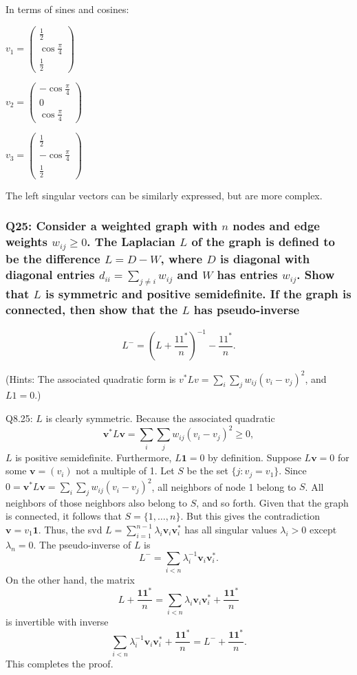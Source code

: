 \documentclass[8pt]{article}
\begin{document}
{In terms of sines and cosines:

$v_1 = \begin{pmatrix} \frac{1}{2} \\ \cos{\frac{\pi}{4}} \\ \frac{1}{2} \end{pmatrix}$

$v_2 = \begin{pmatrix} -\cos{\frac{\pi}{4}} \\ 0 \\ \cos{\frac{\pi}{4}} \end{pmatrix}$

$v_3 = \begin{pmatrix} \frac{1}{2} \\ -\cos{\frac{\pi}{4}} \\ \frac{1}{2} \end{pmatrix}$

The left singular vectors can be similarly expressed, but are more complex.

\subsubsection*{Q25: Consider a weighted graph with \( n \) nodes and edge weights \( w_{ij} \geq 0 \). The Laplacian \( L \) of the graph is defined to be the difference \( L = D - W \), where \( D \) is diagonal with diagonal entries \( d_{ii} = \sum_{j \neq i} w_{ij} \) and \( W \) has entries \( w_{ij} \). Show that \( L \) is symmetric and positive semidefinite. If the graph is connected, then show that the \( L \) has pseudo-inverse}
\[
L^- = \left( L + \frac{11^*}{n} \right)^{-1} - \frac{11^*}{n}.
\]

(Hints: The associated quadratic form is \( v^*Lv = \sum_i \sum_j w_{ij} (v_i - v_j)^2 \), and \( L1 = 0 \).)

Q8.25: \( L \) is clearly symmetric. Because the associated quadratic
\[
\mathbf{v}^* L \mathbf{v} = \sum_i \sum_j w_{ij} (v_i - v_j)^2 \geq 0,
\]
\noindent \( L \) is positive semidefinite. Furthermore, \( L \mathbf{1} = 0 \) by definition. Suppose \( L \mathbf{v} = 0 \) for some \( \mathbf{v} = (v_i) \) not a multiple of 1. Let \( S \) be the set \( \{ j : v_j = v_1 \} \). Since \( 0 = \mathbf{v}^* L \mathbf{v} = \sum_i \sum_j w_{ij} (v_i - v_j)^2 \), all neighbors of node 1 belong to \( S \). All neighbors of those neighbors also belong to \( S \), and so forth. Given that the graph is connected, it follows that \( S = \{ 1, \ldots, n \} \). But this gives the contradiction \( \mathbf{v} = v_1 \mathbf{1} \). Thus, the svd \( L = \sum_{i=1}^{n-1} \lambda_i \mathbf{v}_i \mathbf{v}_i^* \) has all singular values \( \lambda_i > 0 \) except \( \lambda_n = 0 \). The pseudo-inverse of \( L \) is
\[
L^- = \sum_{i < n} \lambda_i^{-1} \mathbf{v}_i \mathbf{v}_i^*.
\]
\noindent On the other hand, the matrix
\[
L + \frac{\mathbf{11}^*}{n} = \sum_{i < n} \lambda_i \mathbf{v}_i \mathbf{v}_i^* + \frac{\mathbf{11}^*}{n}
\]
\noindent is invertible with inverse
\[
\sum_{i < n} \lambda_i^{-1} \mathbf{v}_i \mathbf{v}_i^* + \frac{\mathbf{11}^*}{n} = L^- + \frac{\mathbf{11}^*}{n}.
\]
\noindent This completes the proof.

}
\end{document}
